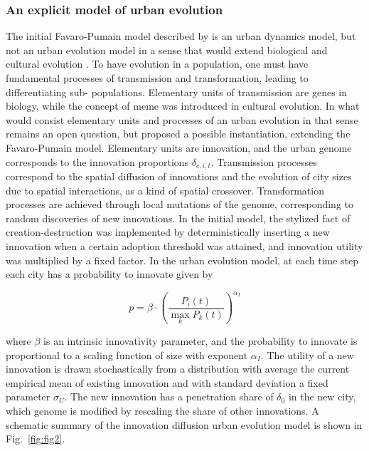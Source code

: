 \documentclass[10pt]{article}
\begin{document}
\subsubsection{An explicit model of urban evolution}

The initial Favaro-Pumain model described by \citep{favaro2011gibrat} is an urban dynamics model, but not an urban evolution model in a sense that would extend biological and cultural evolution \citep{mesoudi2017pursuing}. To have evolution in a population, one must have fundamental processes of transmission and transformation, leading to differentiating sub- populations. Elementary units of transmission are genes in biology, while the concept of meme was introduced in cultural evolution. In what would consist elementary units and processes of an urban evolution in that sense remains an open question, but \citep{raimbault2020model} proposed a possible instantiation, extending the Favaro-Pumain model. Elementary units are innovation, and the urban genome corresponds to the innovation proportions $\delta_{c,i,t}$. Transmission processes correspond to the spatial diffusion of innovations and the evolution of city sizes due to spatial interactions, as a kind of spatial crossover. Transformation processes are achieved through local mutations of the genome, corresponding to random discoveries of new innovations. In the initial model, the stylized fact of creation-destruction was implemented by deterministically inserting a new innovation when a certain adoption threshold was attained, and innovation utility was multiplied by a fixed factor. In the urban evolution model, at each time step each city has a probability to innovate given by

\begin{equation}
	p = \beta \cdot \left( \frac{P_i(t)}{\max_k P_k(t)} \right)^{\alpha_I}	
\end{equation}

where $\beta$ is an intrinsic innovativity parameter, and the probability to innovate is proportional to a scaling function of size with exponent $\alpha_I$. The utility of a new innovation is drawn stochastically from a distribution with average the current empirical mean of existing innovation and with standard deviation a fixed parameter $\sigma_U$. The new innovation has a penetration share of $\delta_0$ in the new city, which genome is modified by rescaling the share of other innovations. A schematic summary of the innovation diffusion urban evolution model is shown in Fig.~\ref{fig:fig2}.
\end{document}
